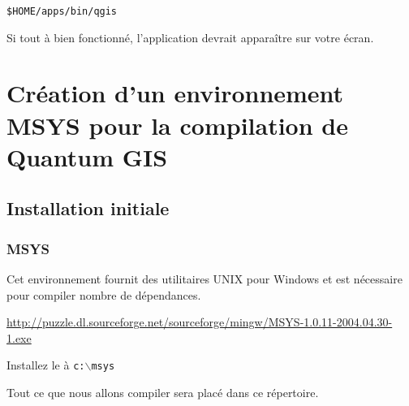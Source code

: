 \begin{verbatim}
$HOME/apps/bin/qgis 
\end{verbatim}

Si tout à bien fonctionné, l'application devrait apparaître sur votre écran.

% 
% 
% 
% 

\section{Création d'un environnement MSYS pour la compilation de Quantum GIS}
\subsection{Installation initiale}
\subsubsection{MSYS}
Cet environnement fournit des utilitaires UNIX pour Windows et est nécessaire pour compiler nombre de dépendances.

\url{
http://puzzle.dl.sourceforge.net/sourceforge/mingw/MSYS-1.0.11-2004.04.30-1.exe}

Installez le à \texttt{c:$\backslash$msys}

Tout ce que nous allons compiler sera placé dans ce répertoire.

% 
% 
% 


